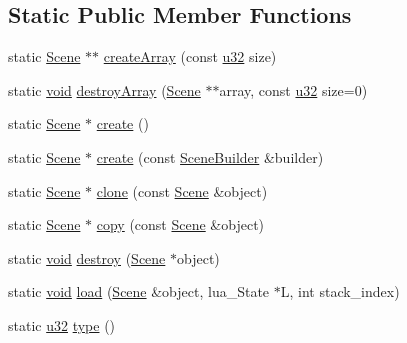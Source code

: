 \subsection*{Static Public Member Functions}
\begin{DoxyCompactItemize}
\item 
static \mbox{\hyperlink{classnjli_1_1_scene}{Scene}} $\ast$$\ast$ \mbox{\hyperlink{classnjli_1_1_scene_a941f75f0519b1ffa1a9bc02cabb33d1d}{create\+Array}} (const \mbox{\hyperlink{_util_8h_a10e94b422ef0c20dcdec20d31a1f5049}{u32}} size)
\item 
static \mbox{\hyperlink{_thread_8h_af1e856da2e658414cb2456cb6f7ebc66}{void}} \mbox{\hyperlink{classnjli_1_1_scene_a0214dc61cbd3b427fc1642c5f7288c16}{destroy\+Array}} (\mbox{\hyperlink{classnjli_1_1_scene}{Scene}} $\ast$$\ast$array, const \mbox{\hyperlink{_util_8h_a10e94b422ef0c20dcdec20d31a1f5049}{u32}} size=0)
\item 
static \mbox{\hyperlink{classnjli_1_1_scene}{Scene}} $\ast$ \mbox{\hyperlink{classnjli_1_1_scene_a51f95c5217cfcf9968bcebc8e874a689}{create}} ()
\item 
static \mbox{\hyperlink{classnjli_1_1_scene}{Scene}} $\ast$ \mbox{\hyperlink{classnjli_1_1_scene_a23a898b795e134892fce27924e89c1d8}{create}} (const \mbox{\hyperlink{classnjli_1_1_scene_builder}{Scene\+Builder}} \&builder)
\item 
static \mbox{\hyperlink{classnjli_1_1_scene}{Scene}} $\ast$ \mbox{\hyperlink{classnjli_1_1_scene_ad3630f0e75efb992b123c89654607040}{clone}} (const \mbox{\hyperlink{classnjli_1_1_scene}{Scene}} \&object)
\item 
static \mbox{\hyperlink{classnjli_1_1_scene}{Scene}} $\ast$ \mbox{\hyperlink{classnjli_1_1_scene_a7f779488f52836cea51f1a38488f876b}{copy}} (const \mbox{\hyperlink{classnjli_1_1_scene}{Scene}} \&object)
\item 
static \mbox{\hyperlink{_thread_8h_af1e856da2e658414cb2456cb6f7ebc66}{void}} \mbox{\hyperlink{classnjli_1_1_scene_ab37540b9164d318889e1323be7fa3b8b}{destroy}} (\mbox{\hyperlink{classnjli_1_1_scene}{Scene}} $\ast$object)
\item 
static \mbox{\hyperlink{_thread_8h_af1e856da2e658414cb2456cb6f7ebc66}{void}} \mbox{\hyperlink{classnjli_1_1_scene_a89333f10a40329f55271c794685575db}{load}} (\mbox{\hyperlink{classnjli_1_1_scene}{Scene}} \&object, lua\+\_\+\+State $\ast$L, int stack\+\_\+index)
\item 
static \mbox{\hyperlink{_util_8h_a10e94b422ef0c20dcdec20d31a1f5049}{u32}} \mbox{\hyperlink{classnjli_1_1_scene_aa760cdf1cda1dd3a460f11e257fd46b1}{type}} ()
\end{DoxyCompactItemize}

